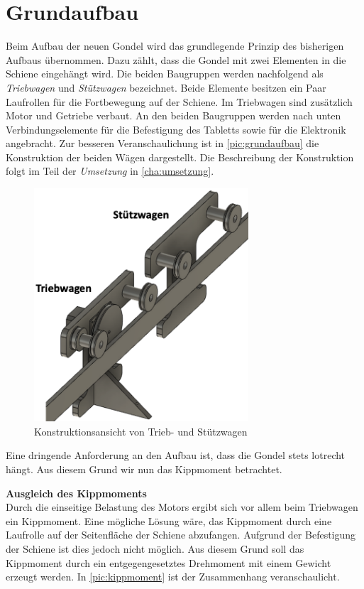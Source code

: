 \section{Grundaufbau}
\label{sec:konzeptGrundaufbau}
Beim Aufbau der neuen Gondel wird das grundlegende Prinzip des bisherigen Aufbaus übernommen. Dazu zählt, dass die Gondel mit zwei Elementen in die Schiene eingehängt wird. Die beiden Baugruppen werden nachfolgend als \textit{Triebwagen} und \textit{Stützwagen} bezeichnet. Beide Elemente besitzen ein Paar Laufrollen für die Fortbewegung auf der Schiene. Im Triebwagen sind zusätzlich Motor und Getriebe verbaut. An den beiden Baugruppen werden nach unten Verbindungselemente für die Befestigung des Tabletts sowie für die Elektronik angebracht. Zur besseren Veranschaulichung ist in  \autoref{pic:grundaufbau} die Konstruktion der beiden Wägen dargestellt. Die Beschreibung der Konstruktion folgt im Teil der \textit{Umsetzung} in \autoref{cha:umsetzung}.


\begin{figure}[h]
	\centering
	\includegraphics[width=8cm]{grundaufbau.png} 
	\caption{Konstruktionsansicht von Trieb- und Stützwagen}
	\label{pic:grundaufbau}
\end{figure}
Eine dringende Anforderung an den Aufbau ist, dass die Gondel stets lotrecht hängt. Aus diesem Grund wir nun das Kippmoment betrachtet. 
\newpage

\textbf{Ausgleich des Kippmoments}\\
 Durch die einseitige Belastung des Motors ergibt sich vor allem beim Triebwagen ein Kippmoment. Eine mögliche Lösung wäre, das Kippmoment durch eine Laufrolle auf der Seitenfläche der Schiene abzufangen. Aufgrund der Befestigung der Schiene ist dies jedoch nicht möglich. Aus diesem Grund soll das Kippmoment durch ein entgegengesetztes Drehmoment mit einem Gewicht erzeugt werden. In \autoref{pic:kippmoment} ist der Zusammenhang veranschaulicht. 

